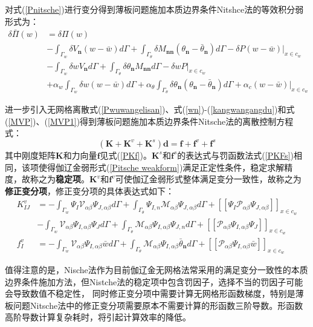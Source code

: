 对式(\ref{Pnitsche})进行变分得到薄板问题施加本质边界条件Nitshce法的等效积分弱形式为：
\begin{equation}\label{Pitsche weakform}
\begin{split}
    \delta\bar{\Pi}(w)&=\delta\Pi(w)\\
 &-\int_{\Gamma_w}\delta V_{\pmb n}(w-\bar{w})d\Gamma+\int_{\Gamma_{\theta}}\delta M_{\pmb{nn}}(\theta_{\pmb n}-\bar{\theta}_{\pmb n})d\Gamma-\delta P(w-\bar{w})\vert_{x\in c_w}\\
 &-\int_{\Gamma_w}\delta wV_{\pmb n}d\Gamma+\int_{\Gamma_{\theta}}\delta\theta_{\pmb n}M_{\pmb{nn}}d\Gamma-\delta wP\vert_{x\in c_w}\\
 &+\alpha_w\int_{\Gamma_w}\delta w(w-\bar{w})d\Gamma+\alpha_\theta\int_{\Gamma_{\theta}}\delta\theta_{\pmb n}(\theta_{\pmb n}-\bar{\theta}_{\pmb n})d\Gamma+\alpha_c(w-\bar{w})\vert_{x\in c_w}
\end{split}
\end{equation}\par
进一步引入无网格离散式(\ref{Pwuwangelisan})、式(\ref{wn})-(\ref{kangwangangdu})和式(\ref{MVP})、(\ref{MVP1})得到薄板问题施加本质边界条件Nitsche法的离散控制方程式：
\begin{equation}
    (\pmb{K}+\pmb{K}^v+\pmb{K}^s)\pmb{d}=\pmb{f}+\pmb{f}^v+\pmb{f}^s
\end{equation}
其中刚度矩阵$\pmb{K}$和力向量$\pmb{f}$见式(\ref{PKf})。$\pmb{K}^s$和$\pmb{f}^s$的表达式与罚函数法式(\ref{PKFs})相同，该项使得伽辽金弱形式(\ref{Pitsche weakform})满足正定性条件，稳定求解精度，故称之为\textbf{稳定项}。$\pmb{K}^v$和$\pmb{f}^v$可使伽辽金弱形式整体满足变分一致性，故称之为\textbf{修正变分项}，修正变分项的具体表达式如下：
\begin{subequations}\label{Pkv}
\begin{align}
 K^v_{IJ}&=-\int_{\Gamma_w}\Psi_I\mathcal{V}_{\alpha\beta}\Psi_{J,\alpha\beta}d\Gamma+\int_{\Gamma_{\theta}}\Psi_{I,n}\mathcal{M}_{\alpha\beta}\Psi_{J,\alpha\beta}d\Gamma+[[\Psi_I\mathcal{P}_{\alpha\beta}\Psi_{J,\alpha\beta}]]_{x\in{c_w}}\nonumber\\
     &-\int_{\Gamma_w}\mathcal{V}_{\alpha\beta}\Psi_{I,\alpha\beta}\Psi_Jd\Gamma+\int_{\Gamma_{\theta}}\mathcal{M}_{\alpha\beta}\Psi_{I,\alpha\beta}\Psi_{J,n}d\Gamma+[[\mathcal{P}_{\alpha\beta}\Psi_{I,\alpha\beta}\Psi_J]]_{x\in{c_w}}\\
 f_{I}^v&=-\int_{\Gamma_w}\mathcal{V}_{\alpha\beta}\Psi_{I,\alpha\beta}\bar{w}d\Gamma+\int_{\Gamma_{\theta}}\mathcal{M}_{\alpha\beta}\Psi_{I,\alpha\beta}\bar{\theta}_{\pmb n}d\Gamma+[[\mathcal{P}_{\alpha\beta}\Psi_{I,\alpha\beta}\bar{w}]]_{x\in{c_w}}
\end{align}
\end{subequations}
\par
值得注意的是，Nische法作为目前伽辽金无网格法常采用的满足变分一致性的本质边界条件施加方法，但Nistche法的稳定项中包含罚因子，选择不当的罚因子可能会导致数值不稳定性，
同时修正变分项中需要计算无网格形函数梯度，特别是薄板问题Nitsche法中的修正变分项需要原本不需要计算的形函数三阶导数。形函数高阶导数计算复杂耗时，将引起计算效率的降低。
